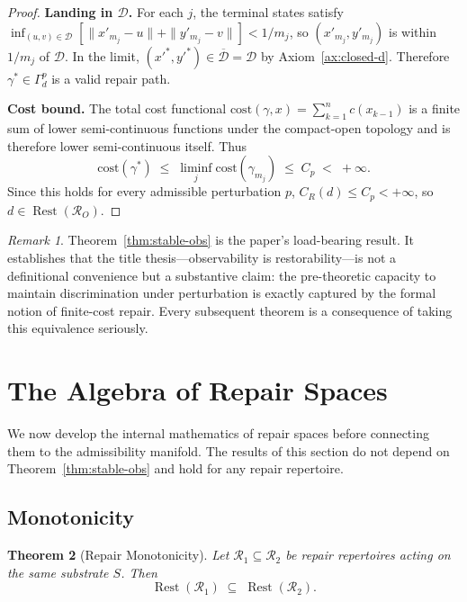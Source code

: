 \documentclass[12pt, oneside]{article}
\theoremstyle{plain}
\newtheorem{theorem}{Theorem}[section]
\theoremstyle{definition}
\theoremstyle{remark}
\newtheorem{remark}[theorem]{Remark}
\theoremstyle{definition}
\DeclareMathOperator{\Rest}{Rest}
\newcommand{\CR}{C_{\!R}}
\newcommand{\Dsub}{\mathcal{D}}
\begin{document}
\begin{proof}
  \textbf{Landing in $\Dsub$.}\;
  For each $j$, the terminal states satisfy
  $\inf_{(u,v) \in \Dsub}[\|x'_{m_j} - u\| + \|y'_{m_j} - v\|]
  < 1/{m_j}$,
  so $(x'_{m_j}, y'_{m_j})$ is within $1/{m_j}$ of $\Dsub$.
  In the limit, $(x'^*, y'^*) \in \overline{\Dsub} = \Dsub$ by
  Axiom~\ref{ax:closed-d}.
  Therefore $\gamma^* \in \Gamma_d^p$ is a valid repair path.

  \textbf{Cost bound.}\;
  The total cost functional
  $\mathrm{cost}(\gamma, x) = \sum_{k=1}^n c(x_{k-1})$ is a finite
  sum of lower semi-continuous functions under the compact-open
  topology and is therefore lower semi-continuous itself.
  Thus
  \[
    \mathrm{cost}(\gamma^*) \;\leq\; \liminf_{j} \mathrm{cost}(\gamma_{m_j})
    \;\leq\; C_p \;<\; +\infty.
  \]
  Since this holds for every admissible perturbation $p$,
  $\CR(d) \leq C_p < +\infty$, so $d \in \Rest(\mathcal{R}_O)$.
\end{proof}

\begin{remark}
  Theorem~\ref{thm:stable-obs} is the paper's load-bearing result.
  It establishes that the title thesis---observability is
  restorability---is not a definitional convenience but a substantive
  claim: the pre-theoretic capacity to maintain discrimination under
  perturbation is exactly captured by the formal notion of finite-cost
  repair.
  Every subsequent theorem is a consequence of taking this equivalence
  seriously.
\end{remark}


\section{The Algebra of Repair Spaces}
\label{sec:structure}

We now develop the internal mathematics of repair spaces before
connecting them to the admissibility manifold.
The results of this section do not depend on
Theorem~\ref{thm:stable-obs} and hold for any repair repertoire.

\subsection{Monotonicity}

\begin{theorem}[Repair Monotonicity]
  Let $\mathcal{R}_1 \subseteq \mathcal{R}_2$ be repair repertoires
  acting on the same substrate $S$.
  Then
  \[
    \Rest(\mathcal{R}_1)
    \;\subseteq\;
    \Rest(\mathcal{R}_2).
  \]
  \label{thm:monotonicity}
\end{theorem}
\end{document}
